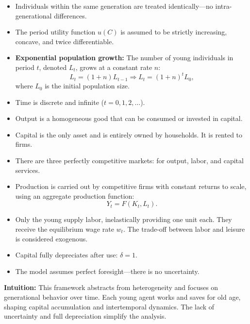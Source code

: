 \documentclass[12pt]{article}
\begin{document}
\begin{itemize}
    \item Individuals within the same generation are treated identically—no intra-generational differences.
    
    \item The period utility function $u(C)$ is assumed to be strictly increasing, concave, and twice differentiable.
    
    \item \textbf{Exponential population growth:} The number of young individuals in period $t$, denoted $L_t$, grows at a constant rate $n$:
    \[
    L_{t} = (1 + n)L_{t-1} \Rightarrow L_t = (1 + n)^t L_0,
    \]
    where $L_0$ is the initial population size.
    
    \item Time is discrete and infinite ($t = 0, 1, 2, \ldots$).
    
    \item Output is a homogeneous good that can be consumed or invested in capital.
    
    \item Capital is the only asset and is entirely owned by households. It is rented to firms.
    
    \item There are three perfectly competitive markets: for output, labor, and capital services.
    
    \item Production is carried out by competitive firms with constant returns to scale, using an aggregate production function:
    \[
    Y_t = F(K_t, L_t).
    \]
    
    \item Only the young supply labor, inelastically providing one unit each. They receive the equilibrium wage rate $w_t$. The trade-off between labor and leisure is considered exogenous.
    
    \item Capital fully depreciates after use: $\delta = 1$.
    
    \item The model assumes perfect foresight—there is no uncertainty.
\end{itemize}

\textbf{Intuition:}  
This framework abstracts from heterogeneity and focuses on generational behavior over time. Each young agent works and saves for old age, shaping capital accumulation and intertemporal dynamics. The lack of uncertainty and full depreciation simplify the analysis.
\end{document}
